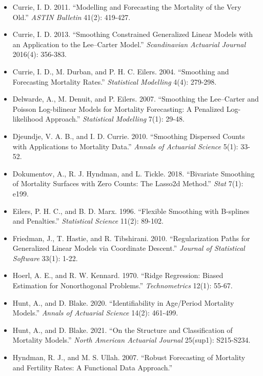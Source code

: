 \documentclass[UTF8, fontset=macnew, a4paper, 12pt]{ctexart}
\begin{document}
\begin{itemize}[leftmargin=2em, label={}, itemsep=3pt]
  \item[] Currie, I. D. 2011. ``Modelling and Forecasting the Mortality of the
        Very Old.'' \textit{ASTIN Bulletin} 41(2): 419-427.
  \item[] Currie, I. D. 2013. ``Smoothing Constrained Generalized Linear Models
        with an Application to the Lee--Carter Model.''
        \textit{Scandinavian Actuarial Journal} 2016(4): 356-383.
  \item[] Currie, I. D., M. Durban, and P. H. C. Eilers. 2004. ``Smoothing
        and Forecasting Mortality Rates.'' \textit{Statistical Modelling}
        4(4): 279-298.
  \item[] Delwarde, A., M. Denuit, and P. Eilers. 2007. ``Smoothing the
        Lee--Carter and Poisson Log-bilinear Models for Mortality Forecasting:
        A Penalized Log-likelihood Approach.''
        \textit{Statistical Modelling} 7(1): 29-48.
  \item[] Djeundje, V. A. B., and I. D. Currie. 2010. ``Smoothing Dispersed
        Counts with Applications to Mortality Data.''
        \textit{Annals of Actuarial Science} 5(1): 33-52.
  \item[] Dokumentov, A., R. J. Hyndman, and L. Tickle. 2018. ``Bivariate
        Smoothing of Mortality Surfaces with Zero Counts: The Lasso2d Method.''
        \textit{Stat} 7(1): e199.
  \item[] Eilers, P. H. C., and B. D. Marx. 1996. ``Flexible Smoothing with
        B-splines and Penalties.'' \textit{Statistical Science} 11(2): 89-102.
  \item[] Friedman, J., T. Hastie, and R. Tibshirani. 2010. ``Regularization
        Paths for Generalized Linear Models via Coordinate Descent.''
        \textit{Journal of Statistical Software} 33(1): 1-22.
  \item[] Hoerl, A. E., and R. W. Kennard. 1970. ``Ridge Regression: Biased
        Estimation for Nonorthogonal Problems.''
        \textit{Technometrics} 12(1): 55-67.
  \item[] Hunt, A., and D. Blake. 2020. ``Identifiability in Age/Period
        Mortality Models.'' \textit{Annals of Actuarial Science} 14(2): 461-499.
  \item[] Hunt, A., and D. Blake. 2021. ``On the Structure and Classification of
        Mortality Models.'' \textit{North American Actuarial Journal}
        25(sup1): S215-S234.
  \item[] Hyndman, R. J., and M. S. Ullah. 2007. ``Robust Forecasting of
        Mortality and Fertility Rates: A Functional Data Approach.''

\end{itemize}
\end{document}
